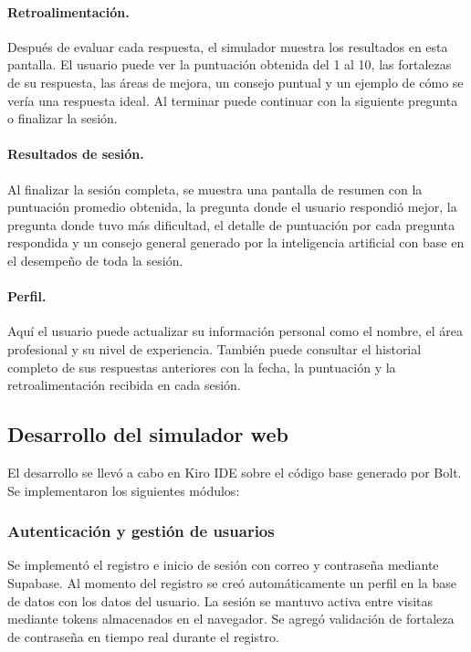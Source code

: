 \paragraph{Retroalimentación.}
Después de evaluar cada respuesta, el simulador muestra los resultados
en esta pantalla. El usuario puede ver la puntuación obtenida del 1
al 10, las fortalezas de su respuesta, las áreas de mejora, un
consejo puntual y un ejemplo de cómo se vería una respuesta ideal.
Al terminar puede continuar con la siguiente pregunta o finalizar
la sesión.

\paragraph{Resultados de sesión.}
Al finalizar la sesión completa, se muestra una pantalla de resumen
con la puntuación promedio obtenida, la pregunta donde el usuario
respondió mejor, la pregunta donde tuvo más dificultad, el detalle
de puntuación por cada pregunta respondida y un consejo general
generado por la inteligencia artificial con base en el desempeño
de toda la sesión.

\paragraph{Perfil.}
Aquí el usuario puede actualizar su información personal como el
nombre, el área profesional y su nivel de experiencia. También puede
consultar el historial completo de sus respuestas anteriores con la
fecha, la puntuación y la retroalimentación recibida en cada sesión.

\subsection{Desarrollo del simulador web}

El desarrollo se llevó a cabo en Kiro IDE sobre el código base
generado por Bolt. Se implementaron los siguientes módulos:

\subsubsection{Autenticación y gestión de usuarios}

Se implementó el registro e inicio de sesión con correo y contraseña
mediante Supabase. Al momento del registro se creó automáticamente
un perfil en la base de datos con los datos del usuario. La sesión
se mantuvo activa entre visitas mediante tokens almacenados en el
navegador. Se agregó validación de fortaleza de contraseña en tiempo
real durante el registro.

